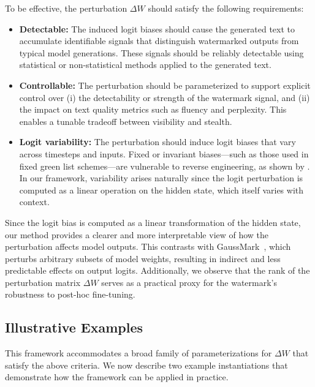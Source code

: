To be effective, the perturbation \( \Delta W \) should satisfy the following requirements:

\begin{itemize}
    \item \textbf{Detectable:} The induced logit biases should cause the generated text to accumulate identifiable signals that distinguish watermarked outputs from typical model generations. These signals should be reliably detectable using statistical or non-statistical methods applied to the generated text.


    \item \textbf{Controllable:} The perturbation should be parameterized to support explicit control over (i) the detectability or strength of the watermark signal, and (ii) the impact on text quality metrics such as fluency and perplexity. This enables a tunable tradeoff between visibility and stealth.

    \item \textbf{Logit variability:} The perturbation should induce logit biases that vary across timesteps and inputs. Fixed or invariant biases—such as those used in fixed green list schemes—are vulnerable to reverse engineering, as shown by \citet{rastogi2024revisitingrobustness}. In our framework, variability arises naturally since the logit perturbation is computed as a linear operation on the hidden state, which itself varies with context.

\end{itemize}

Since the logit bias is computed as a linear transformation of the hidden state, our method provides a clearer and more interpretable view of how the perturbation affects model outputs. This contrasts with GaussMark~\citep{block2025gaussmark}, which perturbs arbitrary subsets of model weights, resulting in indirect and less predictable effects on output logits. Additionally, we observe that the rank of the perturbation matrix \( \Delta W \) serves as a practical proxy for the watermark’s robustness to post-hoc fine-tuning. 


\subsection{Illustrative Examples}
This framework accommodates a broad family of parameterizations for \( \Delta W \) that satisfy the above criteria. We now describe two example instantiations that demonstrate how the framework can be applied in practice.

